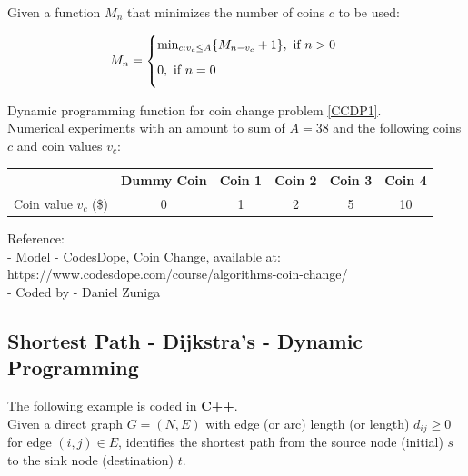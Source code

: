 \documentclass[10pt,bezier]{article}
\begin{document}
Given a function $M_n$ that minimizes the number of coins $c$ to be used:

\begin{subequations}\label{CCDP}
    \begin{align}
    & M_n =
    \begin{cases}
        \vspace{0.2cm} \min_{c:v_c\leq A} \{M_{n-v_c} + 1\}, \text{ if } n > 0\\
        \vspace{0.2cm} 0, \text{ if } n = 0
    \end{cases} \label{CCDP1}
    \end{align}
\end{subequations}

Dynamic programming function for coin change problem \eqref{CCDP1}.\\

Numerical experiments with an amount to sum of $A=38$ and the following coins $c$ and coin values $v_c$:
\begin{table}[!htbp]
    \centering
    \begin{tabular}{c | c c c c c}
            & Dummy Coin & Coin 1 & Coin 2 & Coin 3 & Coin 4\\ \hline
        Coin value $v_c$ (\$) & 0 & 1 & 2 & 5 & 10
    \end{tabular}
\end{table}


\noindent Reference:\\
- Model - CodesDope, Coin Change, available at: {\color{blue}https://www.codesdope.com/course/algorithms-coin-change/}\\
- Coded by - Daniel Zuniga

\newpage
\subsection{Shortest Path - Dijkstra's - Dynamic Programming}\label{Section7.5}
The following example is coded in {\color{blue}\textbf{C++}}.\\

Given a direct graph $G = (N,E)$ with edge (or arc) length (or length) $d_{ij} \geq 0$ for edge $(i,j) \in E$, identifies the shortest path from the source node (initial) $s$ to the sink node (destination) $t$.\\
\end{document}
